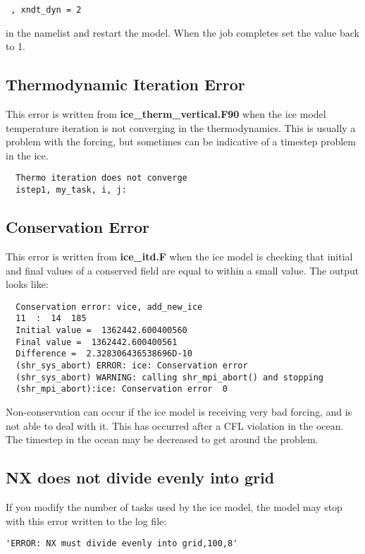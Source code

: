 \begin{verbatim}
 , xndt_dyn = 2
\end{verbatim}

in the namelist and restart the model.  When the job completes set the value
back to 1.

\subsection{Thermodynamic Iteration Error}

This error is written from {\bf ice\_therm\_vertical.F90} when the ice model 
temperature iteration is not converging in the thermodynamics.  This is usually
a problem with the forcing, but sometimes can be indicative of a timestep
problem in the ice.

\begin{verbatim}
  Thermo iteration does not converge
  istep1, my_task, i, j:
\end{verbatim}

\subsection{Conservation Error}

This error is written from {\bf ice\_itd.F} when the ice model is checking
that initial and final values of a conserved field are equal to within
a small value. The output looks like:

\begin{verbatim}
  Conservation error: vice, add_new_ice
  11  :  14  185
  Initial value =  1362442.600400560
  Final value =  1362442.600400561
  Difference =  2.328306436538696D-10
  (shr_sys_abort) ERROR: ice: Conservation error
  (shr_sys_abort) WARNING: calling shr_mpi_abort() and stopping
  (shr_mpi_abort):ice: Conservation error  0
\end{verbatim}

Non-conservation can occur if the ice model is receiving
very bad forcing, and is not able to deal with it.  This has occurred
after a CFL violation in the ocean.  The timestep in the ocean may
be decreased to get around the problem.

\subsection{NX does not divide evenly into grid}

If you modify the number of tasks used by the ice model, the model may stop
with this error written to the log file:
\begin{verbatim}
'ERROR: NX must divide evenly into grid,100,8'
\end{verbatim}

